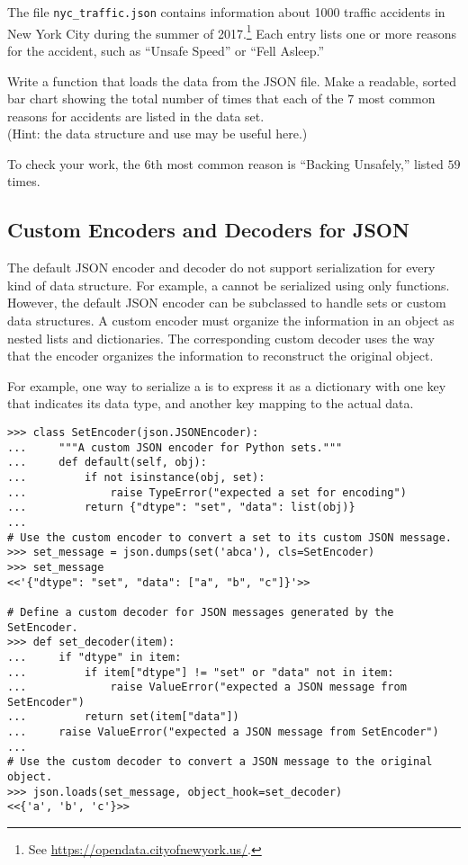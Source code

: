 \begin{problem} %
The file \texttt{nyc\_traffic.json} contains information about 1000 traffic accidents in New York City during the summer of 2017.\footnote{See \url{https://opendata.cityofnewyork.us/}.}
Each entry lists one or more reasons for the accident, such as ``Unsafe Speed'' or ``Fell Asleep.''

Write a function that loads the data from the JSON file.
Make a readable, sorted bar chart showing the total number of times that each of the $7$ most common reasons for accidents are listed in the data set.
\\ (Hint: the  data structure and use  may be useful here.)

To check your work, the $6$th most common reason is ``Backing Unsafely,'' listed $59$ times.
\end{problem}

\subsection*{Custom Encoders and Decoders for JSON} %

The default JSON encoder and decoder do not support serialization for every kind of data structure.
For example, a  cannot be serialized using only  functions.
However, the default JSON encoder can be subclassed to handle sets or custom data structures.
A custom encoder must organize the information in an object as nested lists and dictionaries.
The corresponding custom decoder uses the way that the encoder organizes the information to reconstruct the original object.

For example, one way to serialize a  is to express it as a dictionary with one key that indicates its data type, and another key mapping to the actual data.

\begin{lstlisting}
>>> class SetEncoder(json.JSONEncoder):
...     """A custom JSON encoder for Python sets."""
...     def default(self, obj):
...         if not isinstance(obj, set):
...             raise TypeError("expected a set for encoding")
...         return {"dtype": "set", "data": list(obj)}
...
# Use the custom encoder to convert a set to its custom JSON message.
>>> set_message = json.dumps(set('abca'), cls=SetEncoder)
>>> set_message
<<'{"dtype": "set", "data": ["a", "b", "c"]}'>>

# Define a custom decoder for JSON messages generated by the SetEncoder.
>>> def set_decoder(item):
...     if "dtype" in item:
...         if item["dtype"] != "set" or "data" not in item:
...             raise ValueError("expected a JSON message from SetEncoder")
...         return set(item["data"])
...     raise ValueError("expected a JSON message from SetEncoder")
...
# Use the custom decoder to convert a JSON message to the original object.
>>> json.loads(set_message, object_hook=set_decoder)
<<{'a', 'b', 'c'}>>
\end{lstlisting}


